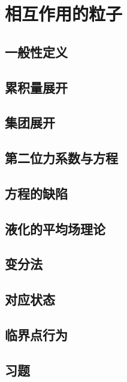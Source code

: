 \chapter{相互作用的粒子}

\section{一般性定义}
\section{累积量展开}
\section{集团展开}
\section{第二位力系数与方程}
\section{方程的缺陷}
\section{液化的平均场理论}
\section{变分法}
\section{对应状态}
\section{临界点行为}
\section*{习题}